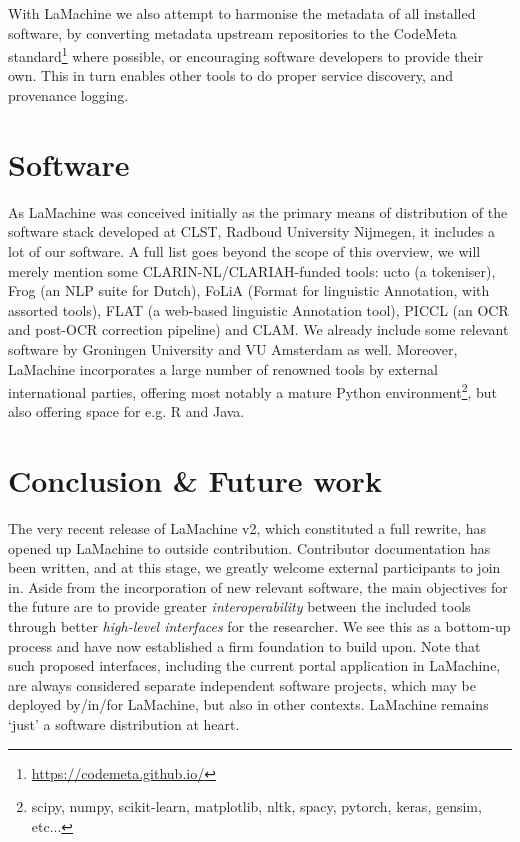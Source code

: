 \documentclass[a4paper,11pt]{article}
\begin{document}
With LaMachine we also attempt to harmonise the metadata of all installed software, by converting metadata upstream repositories to
the CodeMeta standard\footnote{\url{https://codemeta.github.io/}} \cite{codemeta,codemetar} where possible, or encouraging software developers to provide
their own. This in turn enables other tools to do proper service discovery, and provenance logging.

\section{Software}

As LaMachine was conceived initially as the primary means of distribution of the software stack developed at CLST,
Radboud University Nijmegen, it includes a lot of our software. A full list goes beyond the scope of this overview, we
will merely mention some CLARIN-NL/CLARIAH-funded tools: ucto (a tokeniser), Frog (an NLP suite for Dutch), FoLiA (Format
for linguistic Annotation, with assorted tools), FLAT (a web-based linguistic Annotation tool), PICCL (an OCR and
post-OCR correction pipeline) and CLAM. We already include some relevant software by Groningen University and VU
Amsterdam as well. Moreover, LaMachine incorporates a large number of renowned tools by external international parties,
offering most notably a mature Python environment\footnote{scipy, numpy, scikit-learn, matplotlib, nltk, spacy, pytorch,
keras, gensim, etc...}, but also offering space for e.g. R and Java.

\section{Conclusion \& Future work}

The very recent release of LaMachine v2, which constituted a full rewrite, has opened up LaMachine to outside
contribution. Contributor documentation has been written, and at this stage, we greatly welcome external participants
to join in. Aside from the incorporation of new relevant software, the main objectives for the future are to provide
greater \emph{interoperability} between the included tools through better \emph{high-level interfaces} for the
researcher. We see this as a bottom-up process and have now established a firm foundation to build upon. Note that such
proposed interfaces, including the current portal application in LaMachine, are always considered separate independent
software projects, which may be deployed by/in/for LaMachine, but also in other contexts. LaMachine remains `just'
a software distribution at heart.
\end{document}
